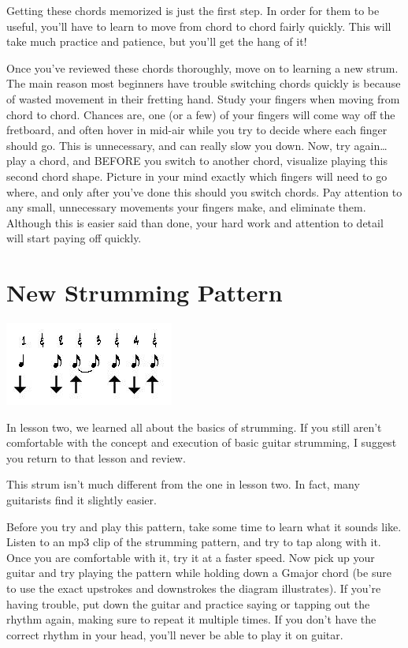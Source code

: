Getting these chords memorized is just the first step. In order for them to be
useful, you'll have to learn to move from chord to chord fairly quickly. This
will take much practice and patience, but you'll get the hang of it!

Once you've reviewed these chords thoroughly, move on to learning a new strum.
The main reason most beginners have trouble switching chords quickly is because
of wasted movement in their fretting hand. Study your fingers when moving from
chord to chord. Chances are, one (or a few) of your fingers will come way off
the fretboard, and often hover in mid-air while you try to decide where each
finger should go. This is unnecessary, and can really slow you down. Now, try
again\ldots{} play a chord, and BEFORE you switch to another chord, visualize
playing this second chord shape. Picture in your mind exactly which fingers
will need to go where, and only after you've done this should you switch
chords. Pay attention to any small, unnecessary movements your fingers make,
and eliminate them. Although this is easier said than done, your hard work and
attention to detail will start paying off quickly.

\section{New Strumming Pattern}
\includegraphics{partthree/strum3.jpg}

In lesson two, we learned all about the basics of strumming. If you still
aren't comfortable with the concept and execution of basic guitar strumming, I
suggest you return to that lesson and review.

This strum isn't much different from the one in lesson two. In fact, many
guitarists find it slightly easier.

Before you try and play this pattern, take some time to learn what it sounds
like. Listen to an mp3 clip of the strumming pattern, and try to tap along with
it. Once you are comfortable with it, try it at a faster speed. Now pick up
your guitar and try playing the pattern while holding down a Gmajor chord (be
sure to use the exact upstrokes and downstrokes the diagram illustrates). If
you're having trouble, put down the guitar and practice saying or tapping out
the rhythm again, making sure to repeat it multiple times. If you don't have
the correct rhythm in your head, you'll never be able to play it on guitar.


